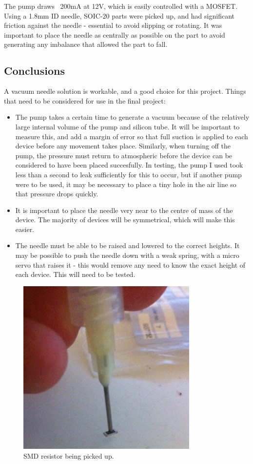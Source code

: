 \documentclass[a4paper,11pt]{article}  %
\begin{document}
The pump draws ~200mA at 12V, which is easily controlled with a MOSFET. Using a 1.8mm ID needle, SOIC-20 parts were picked up, 
and had significant friction against the needle - essential to avoid slipping or rotating. It was important to place the needle 
as centrally as possible on the part to avoid generating any imbalance that allowed the part to fall. 

\subsection{Conclusions}
A vacuum needle solution is workable, and a good choice for this project. Things that need to be considered for use in the final project:

\begin{itemize}
	\item	The pump takes a certain time to generate a vacuum because of the relatively large internal volume of the pump
		and silicon tube. It will be important to measure this, and add a margin of error so that full suction is applied
		to each device before any movement takes place. Similarly, when turning off the pump, the pressure must return to
		atmospheric before the device can be considered to have been placed succesfully. In testing, the pump I used took
		less than a second to leak sufficiently for this to occur, but if another pump were to be used, it may be necessary
		to place a tiny hole in the air line so that pressure drops quickly.
	\item	It is important to place the needle very near to the centre of mass of the device. The majority of devices will be
		symmetrical, which will make this easier.
	\item	The needle must be able to be raised and lowered to the correct heights. It may be possible to push the needle down
		with a weak spring, with a micro servo that raises it - this would remove any need to know the exact height of each
		device. This will need to be tested.
\end{itemize}

\begin{figure}[ht!]
\centering
\includegraphics[width=90mm]{resources/needle_with_resistor.jpg}
\caption{SMD resistor being picked up.}
\label{overflow}
\end{figure}
\end{document}
